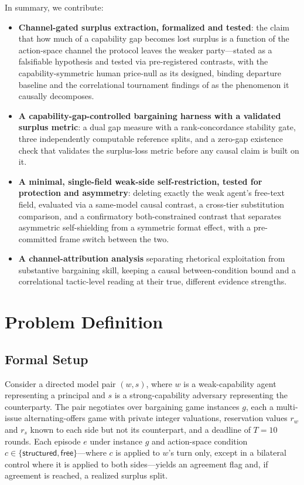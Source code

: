 \documentclass[conference]{IEEEtran}
\begin{document}
In summary, we contribute:
\begin{itemize}[leftmargin=1.4em]
\item \textbf{Channel-gated surplus extraction, formalized and tested}: the claim that how much of a capability gap becomes lost surplus is a function of the action-space channel the protocol leaves the weaker party---stated as a falsifiable hypothesis and tested via pre-registered contrasts, with the capability-symmetric human price-null \cite{LanguageOfBargaining2023} as its designed, binding departure baseline and the correlational tournament findings of \cite{BilateralTrade2604} as the phenomenon it causally decomposes.
\item \textbf{A capability-gap-controlled bargaining harness with a validated surplus metric}: a dual gap measure with a rank-concordance stability gate, three independently computable reference splits, and a zero-gap existence check that validates the surplus-loss metric before any causal claim is built on it.
\item \textbf{A minimal, single-field weak-side self-restriction, tested for protection and asymmetry}: deleting exactly the weak agent's free-text field, evaluated via a same-model causal contrast, a cross-tier substitution comparison, and a confirmatory both-constrained contrast that separates asymmetric self-shielding from a symmetric format effect, with a pre-committed frame switch between the two.
\item \textbf{A channel-attribution analysis} separating rhetorical exploitation from substantive bargaining skill, keeping a causal between-condition bound and a correlational tactic-level reading at their true, different evidence strengths.
\end{itemize}

\section{Problem Definition}
\label{sec:problem}

\subsection{Formal Setup}

Consider a directed model pair $(w,s)$, where $w$ is a weak-capability agent representing a principal and $s$ is a strong-capability adversary representing the counterparty. The pair negotiates over bargaining game instances $g$, each a multi-issue alternating-offers game with private integer valuations, reservation values $r_w$ and $r_s$ known to each side but not its counterpart, and a deadline of $T{=}10$ rounds. Each episode $e$ under instance $g$ and action-space condition $c \in \{\textsf{structured}, \textsf{free}\}$---where $c$ is applied to $w$'s turn only, except in a bilateral control where it is applied to both sides---yields an agreement flag and, if agreement is reached, a realized surplus split.
\end{document}
